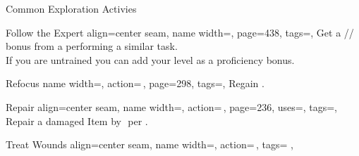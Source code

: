 \renewcommand{\PageBottomReferences}{%
    \hfill APG = Advanced Players Guide
    \hfill GMC = GM Core\\
    \hfill KCG = Kingmaker Companion Guide
    \hfill SoM = Secrets of Magic
    \hfill TV = Treasure Vault
}
\setlength{\parindent}{0mm}%
\begin{PageFront}
    \begin{Tables}{\frontTableHeight}
        \begin{Table}{Common Exploration Activies}
            \begin{entry}{Follow the Expert}{%
                align=center seam,
                name width=\activityLength,%
                page=438,
                tags=\Concentrate,
            }
                Get a \E{}/\M{}/\Le{}\,\Cirm bonus from a 
                performing a similar task.\\
                If you are untrained you can add your level as a proficiency bonus.
            \end{entry}
            \begin{entry}{Refocus}{%
                name width=\activityLength,%
                action=\,,
                page=298,
                tags=\Concentrate,
            }
                Regain  .
            \end{entry}
            \begin{entry}{Repair}{%
                align=center seam,%
                name width=\activityLength,%
                action=\,,
                page=236,
                uses={\Crafting[][before=Item]},%
                tags=\Manipulate,
            }
                Repair a damaged Item by \,\HPs{}\,\HPs per .\\
                \hfill {}
            \end{entry}
            \begin{entry}{Treat Wounds}{%
                align=center seam,
                name width=\activityLength,%
                action=\,,
                tags=
                ,
}
\end{entry}
\end{Table}
\end{Tables}
\end{PageFront}
